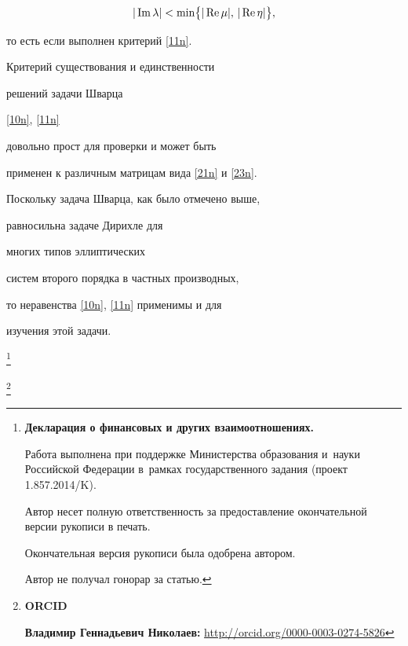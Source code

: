 $$

 |\mathop{\rm Im} \lambda|<\min\bigr\{ |\mathop{\rm Re} \mu|,\,|\mathop{\rm Re} \eta|

 \bigr\},

 $$

то есть если  выполнен  критерий \eqref{11n}.



\smallskip



 Критерий существования и единственности

решений задачи Шварца

 \eqref{10n}, \eqref{11n}

довольно прост для проверки и может быть

 применен к различным матрицам вида  \eqref{21n} и \eqref{23n}.

  Поскольку задача Шварца, как было отмечено выше,

   равносильна задаче Дирихле для

  многих  типов эллиптических

   систем второго порядка в частных производных,

   то неравенства \eqref{10n}, \eqref{11n} применимы и для

изучения   этой задачи.







\thanks{{\bf Декларация о финансовых и других взаимоотношениях.}

Работа выполнена при поддержке Министерства образования и~науки Российской Федерации в~рамках государственного задания (проект 1.857.2014/K).

Автор несет полную ответственность за предоставление окончательной версии рукописи в печать.

Окончательная версия рукописи была одобрена автором.

Автор не получал гонорар за статью.

}











\thanks{{\bf ORCID}



{\bf Владимир Геннадьевич Николаев:} \url{http://orcid.org/0000-0003-0274-5826}

}



